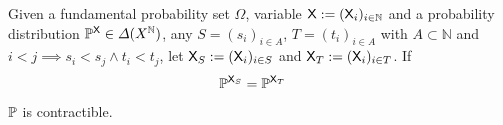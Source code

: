 






\begin{definition}
Given a fundamental probability set $\Omega$, variable $\mathsf{X}:=(\mathsf{X}_i)_{i\in \mathbb{N}}$ and a probability distribution $\mathbb{P}^{\mathsf{X}}\in\Delta(X^{\mathbb{N}})$, any $S=(s_i)_{i\in A}$, $T=(t_i)_{i\in A}$ with $A\subset\mathbb{N}$ and $i<j\implies s_i<s_j \land t_i<t_j$, let $\mathsf{X}_S:=(\mathsf{X}_i)_{i\in S}$ and $\mathsf{X}_T:=(\mathsf{X}_i)_{i\in T}$. If
\begin{align}
    \mathbb{P}^{\mathsf{X}_S} &= \mathbb{P}^{\mathsf{X}_T}
\end{align}
 $\mathbb{P}$ is contractible.
\end{definition}

